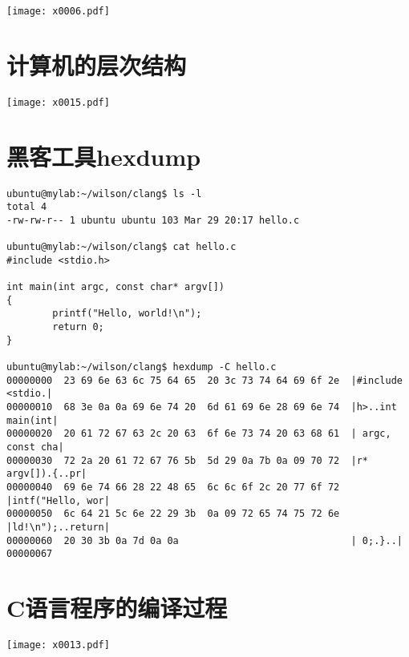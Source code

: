 \documentclass[cn,hazy,blue,14pt,screen]{elegantnote}
\begin{document}
\begin{center}
	\texttt{[image: x0006.pdf]}
\end{center}
\newpage

\section{计算机的层次结构}

\begin{center}
	\texttt{[image: x0015.pdf]}
\end{center}
\newpage

\section{黑客工具hexdump}
\begin{lstlisting}
ubuntu@mylab:~/wilson/clang$ ls -l
total 4
-rw-rw-r-- 1 ubuntu ubuntu 103 Mar 29 20:17 hello.c

ubuntu@mylab:~/wilson/clang$ cat hello.c
#include <stdio.h>

int main(int argc, const char* argv[])
{
        printf("Hello, world!\n");
        return 0;
}

ubuntu@mylab:~/wilson/clang$ hexdump -C hello.c
00000000  23 69 6e 63 6c 75 64 65  20 3c 73 74 64 69 6f 2e  |#include <stdio.|
00000010  68 3e 0a 0a 69 6e 74 20  6d 61 69 6e 28 69 6e 74  |h>..int main(int|
00000020  20 61 72 67 63 2c 20 63  6f 6e 73 74 20 63 68 61  | argc, const cha|
00000030  72 2a 20 61 72 67 76 5b  5d 29 0a 7b 0a 09 70 72  |r* argv[]).{..pr|
00000040  69 6e 74 66 28 22 48 65  6c 6c 6f 2c 20 77 6f 72  |intf("Hello, wor|
00000050  6c 64 21 5c 6e 22 29 3b  0a 09 72 65 74 75 72 6e  |ld!\n");..return|
00000060  20 30 3b 0a 7d 0a 0a                              | 0;.}..|
00000067
\end{lstlisting}

\newpage
\section{C语言程序的编译过程}
\begin{center}
	\texttt{[image: x0013.pdf]}
\end{center}
\newpage
\end{document}
